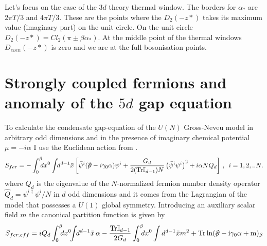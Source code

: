 \documentclass[twoside]{article}
\begin{document}
Let's focus on the case of the $3d$ theory thermal window. The borders for $\alpha_*$ are $2\pi T/3$ and $4\pi T/3$. These are the points where the $D_2(-z*)$ \cite{Zagier1, Zagier2} takes its maximum value (imaginary part) on the unit circle. On the unit circle $D_2(-z*)=Cl_2(\pi\pm\beta\alpha_*)$. At the middle point of the thermal windows $D_{even}(-z*)$ is zero and we are at the full bosonisation points.

\section{Strongly coupled fermions and anomaly of the $5d$ gap equation}
 To calculate the condensate gap-equation of the $U(N)$ Gross-Neveu model in arbitrary odd dimensions and in the presence of imaginary chemical potential $\mu=-i\alpha$ I use the Euclidean action from \cite{Filothodoros:2018}.
 \begin{equation}
 	S_{fer} = -\int_0^\beta \!\!\!dx^0\int \!\!d^{d-1}\bar{x} \left[\bar{\psi }^{i}(\slash\!\!\!\partial  -i\gamma_0\alpha)\psi ^{i}+\frac{G_d}{2({\rm Tr}\mathbb I_{d-1})N}\left (\bar{\psi }^{i}\psi ^{i}\right )^{2} +i\alpha NQ_d\right]\,,\,\,\,i=1,2,..N.
 \end{equation}
where $Q_d$ is the eigenvalue of the $N$-normalized fermion number density operator $\hat{Q}_d=\psi^{i\dagger}\psi^i/N$ in $d$ odd dimensions and it comes from the Lagrangian of the model that possesses a $U(1)$ global symmetry. Introducing an auxiliary scalar field $m$ the canonical partition function is given by
 \begin{equation}
 	S_{fer,eff}=iQ_d\int_0^\beta \!\!\!dx^0\!\!\int\!\!d^{d-1}\bar{x}\,\alpha-\frac{{\rm Tr}\mathbb I_{d-1}}{2G_d}\int_0^\beta \!\!\!dx^0\int d^{d-1}\bar{x} m^2+\rm Tr\ln(\slash\!\!\!\partial-i\gamma_0\alpha+m)_\beta
 \end{equation}
 
\end{document}
